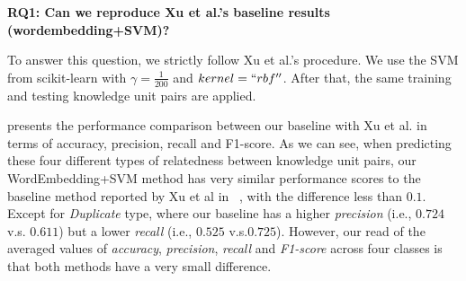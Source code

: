 
\textbf{RQ1: Can we reproduce Xu et al.'s baseline results (wordembedding+SVM)?}



To answer this question, we strictly follow Xu et al.'s procedure\cite{xu2016predicting}. We 
use the SVM from scikit-learn with $\gamma = \frac{1}{200}$ and $kernel= ``rbf''$. After that,
the same training and testing knowledge unit pairs are applied.

  presents the performance comparison between our baseline with
 Xu et al. in terms of accuracy, precision, recall and F1-score. As we can see, 
 when predicting these four different types of relatedness between knowledge unit pairs,
 our WordEmbedding+SVM method has  very  similar performance scores to the baseline method
 reported by Xu et al in ~\cite{xu2016predicting}, with the difference less than $0.1$.  
 Except for {\it Duplicate} type, where our baseline 
has a higher {\it precision} (i.e., $0.724$ v.s. $0.611$) but a lower {\it recall} (i.e., $0.525$ v.s.$0.725$).
However, our read of the averaged values of {\it accuracy}, {\it precision}, {\it recall}
and {\it F1-score} across four classes is that both methods have
a very small difference.

